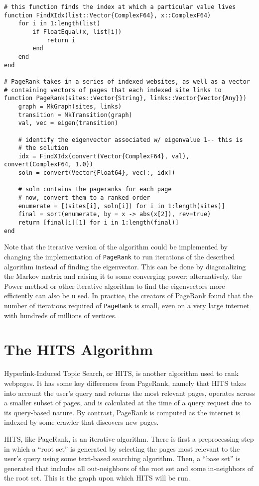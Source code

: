 \documentclass{article}
\begin{document}
\begin{verbatim}
# this function finds the index at which a particular value lives
function FindXIdx(list::Vector{ComplexF64}, x::ComplexF64)
    for i in 1:length(list)
        if FloatEqual(x, list[i])
            return i
        end
    end
end

# PageRank takes in a series of indexed websites, as well as a vector 
# containing vectors of pages that each indexed site links to
function PageRank(sites::Vector{String}, links::Vector{Vector{Any}})
    graph = MkGraph(sites, links)
    transition = MkTransition(graph)
    val, vec = eigen(transition)
    
    # identify the eigenvector associated w/ eigenvalue 1-- this is 
    # the solution
    idx = FindXIdx(convert(Vector{ComplexF64}, val), convert(ComplexF64, 1.0))
    soln = convert(Vector{Float64}, vec[:, idx])
    
    # soln contains the pageranks for each page
    # now, convert them to a ranked order
    enumerate = [(sites[i], soln[i]) for i in 1:length(sites)]
    final = sort(enumerate, by = x -> abs(x[2]), rev=true)
    return [final[i][1] for i in 1:length(final)]
end
\end{verbatim}

Note that the iterative version of the algorithm could be implemented by changing the implementation of \texttt{PageRank} to run iterations of the described algorithm instead of finding the eigenvector. This can be done by diagonalizing the Markov matrix and raising it to some converging power; alternatively, the Power method or other iterative algorithm to find the eigenvectors more efficiently can also be u sed. In practice, the creators of PageRank found that the number of iterations required of \texttt{PageRank} is small, even on a very large internet with hundreds of millions of vertices.

\section{The HITS Algorithm}
Hyperlink-Induced Topic Search, or HITS, is another algorithm used to rank webpages. It has some key differences from PageRank, namely that HITS takes into account the user's query and returns the most relevant pages, operates across a smaller subset of pages, and is calculated at the time of a query request due to its query-based nature. By contrast, PageRank is computed as the internet is indexed by some crawler that discovers new pages.

HITS, like PageRank, is an iterative algorithm. There is first a preprocessing step in which a ``root set'' is generated by selecting the pages most relevant to the user's query using some text-based searching algorithm. Then, a ``base set'' is generated that includes all out-neighbors of the root set and some in-neighbors of the root set. This is the graph upon which HITS will be run. 
\end{document}
